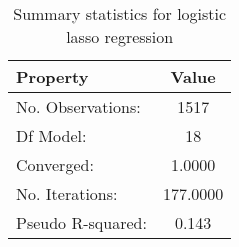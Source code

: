 \begin{table}
\centering
\caption{Summary statistics for logistic lasso regression}
\label{tab:stats_logit_summary}
\begin{tabular}{lc}
\toprule
         Property &    Value \\
\midrule
No. Observations: &     1517 \\
        Df Model: &       18 \\
       Converged: &   1.0000 \\
  No. Iterations: & 177.0000 \\
Pseudo R-squared: &    0.143 \\
\bottomrule
\end{tabular}
\end{table}
